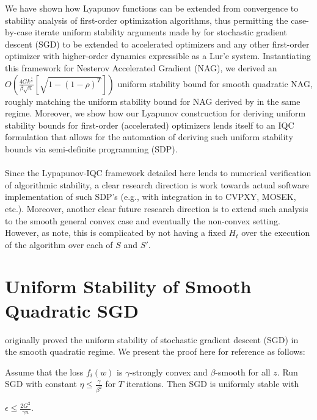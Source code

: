 \documentclass[twoside,11pt]{article}
\begin{document}
We have shown how Lyapunov functions can be extended from convergence to stability analysis of first-order optimization algorithms, thus permitting the case-by-case iterate uniform stability arguments made by \cite{HRS16} for stochastic gradient descent (SGD) to be extended to accelerated optimizers and any other first-order optimizer with higher-order dynamics expressible as a Lur'e system. Instantiating this framework for Nesterov Accelerated Gradient (NAG), we derived an $O(\frac{4Gk^{\frac{1}{4}}}{\beta \sqrt{n}}[\sqrt{1-(1-\rho)^T}])$ uniform stability bound for smooth quadratic NAG, roughly matching the uniform stability bound for NAG derived by \cite{CJY18} in the same regime. Moreover, we show how our Lyapunov construction for deriving uniform stability bounds for first-order (accelerated) optimizers lends itself to an IQC formulation that allows for the automation of deriving such uniform stability bounds via semi-definite programming (SDP). \\
\\
Since the Lypapunov-IQC framework detailed here lends to numerical verification of algorithmic stability, a clear research direction is work towards actual software implementation of such SDP's (e.g., with integration in to CVPXY, MOSEK, etc.). Moreover, another clear future research direction is to extend such analysis to the smooth general convex case and eventually the non-convex setting. However, as \cite{AK21} note, this is complicated by not having a fixed $H_t$ over the execution of the algorithm over each of $S$ and $S'$.

\newpage

\appendix
\section{Uniform Stability of Smooth Quadratic SGD}

\cite{HRS16} originally proved the uniform stability of stochastic gradient descent (SGD) in the smooth quadratic regime. We present the proof here for reference as follows:

\begin{theorem}
Assume that the loss $f_i(w)$ is $\gamma$-strongly convex and $\beta$-smooth for all $z$. Run SGD with constant $\eta \leq \frac{\gamma}{\beta^2}$ for $T$ iterations. Then SGD is uniformly stable with

\begin{center}
$\epsilon \leq \frac{2G^2}{\gamma n}$.
\end{center}
\end{theorem}
\end{document}

